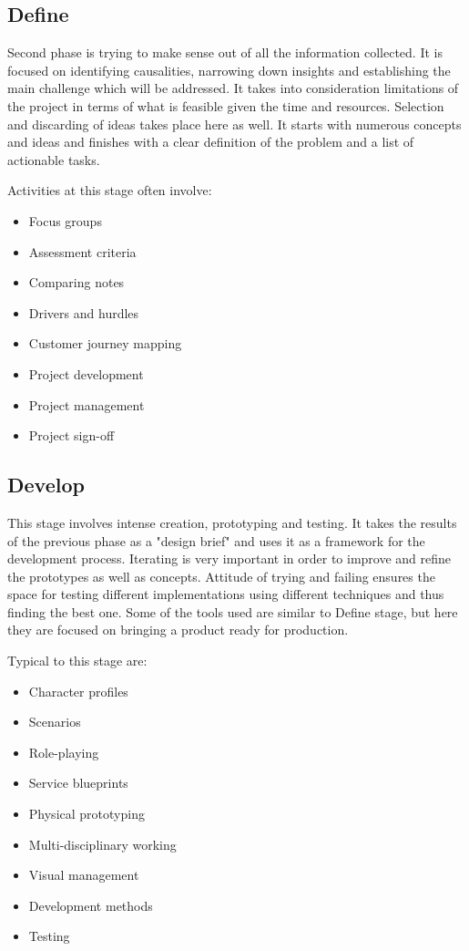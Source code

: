 		\subsection{Define}
		
Second phase is trying to make sense out of all the information collected. It is focused on identifying causalities, narrowing down insights and establishing the main challenge which will be addressed. It takes into consideration limitations of the project in terms of what is feasible given the time and resources. Selection and discarding of ideas takes place here as well. It starts with numerous concepts and ideas and finishes with a clear definition of the problem and a list of actionable tasks.

Activities at this stage often involve:
\begin{itemize}
\item Focus groups
\item Assessment criteria
\item Comparing notes
\item Drivers and hurdles
\item Customer journey mapping
\item Project development
\item Project management
\item Project sign-off
\end{itemize}

		
		\subsection{Develop}
		
This stage involves intense creation, prototyping and testing. It takes the results of the previous phase as a "design brief" and uses it as a framework for the development process. Iterating is very important in order to improve and refine the prototypes as well as concepts. Attitude of trying and failing ensures the space for testing different implementations using different techniques and thus finding the best one. Some of the tools used are similar to Define stage, but here they are focused on bringing a product ready for production.

Typical to this stage are:
\begin{itemize}
\item Character profiles
\item Scenarios
\item Role-playing
\item Service blueprints
\item Physical prototyping
\item Multi-disciplinary working
\item Visual management
\item Development methods
\item Testing
\end{itemize}		
		
